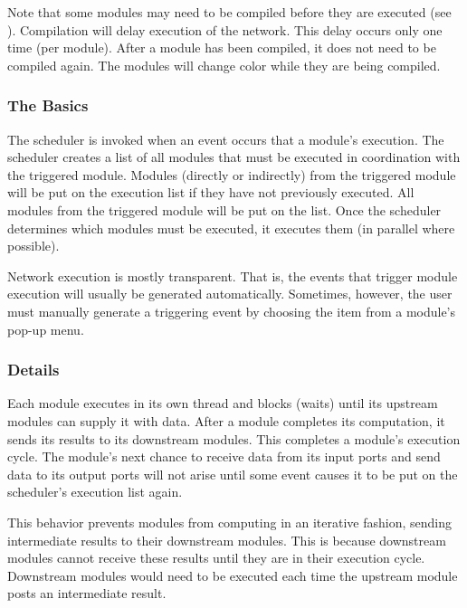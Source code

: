 Note that some modules may need to be compiled before they are
executed (see ).  Compilation
will delay execution of the network.  This delay occurs only one time
(per module).  After a module has been compiled, it does not need to be
compiled again.  The modules will change color while they
are being compiled.


\subsubsection{The Basics}

The scheduler is invoked when an event occurs that  a
module's execution.  The scheduler creates a list of all modules that
must be executed in coordination with the triggered module. Modules
 (directly or indirectly) from the triggered module will
be put on the execution list if they have not previously executed.
All modules  from the triggered module will be put
on the list.  Once the scheduler determines which modules must be
executed, it executes them (in parallel where possible).

Network execution is mostly transparent.  That is, the events that trigger
module execution will usually be generated automatically. Sometimes, however, the user must manually
generate a triggering event by choosing the  item from a
module's pop-up menu.

\subsubsection{Details}

Each module executes in its own thread and blocks (waits) until its upstream
modules can supply it with data.  After a module completes its computation,
it sends its results to its downstream modules.  This completes a module's
execution cycle.  The module's next chance to receive data from its input ports
and send data to its output ports will not arise until some event
causes it to be put on the scheduler's execution list again.  

This behavior prevents modules from computing in an iterative fashion,
sending intermediate results to their downstream modules.  This is because
downstream modules cannot receive these results until they are in their
execution cycle.   Downstream modules would need to be executed each time the
upstream module posts an intermediate result.


